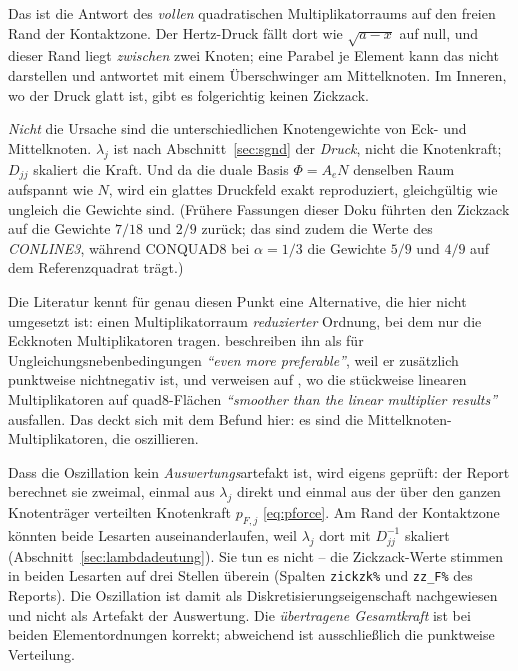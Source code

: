 \documentclass[a4paper,11pt]{article}
\def\bm#1{#1}%
\def\tfrac#1#2{#1/#2}%
\def\tilde#1{#1}%
\newcommand{\code}[1]{\texttt{\small #1}}
\begin{document}
\begin{itemize}
        Das ist die Antwort des \emph{vollen} quadratischen Multiplikatorraums auf den freien Rand
        der Kontaktzone. Der Hertz-Druck fällt dort wie $\sqrt{a-x}$ auf null, und dieser Rand
        liegt \emph{zwischen} zwei Knoten; eine Parabel je Element kann das nicht darstellen und
        antwortet mit einem Überschwinger am Mittelknoten. Im Inneren, wo der Druck glatt ist,
        gibt es folgerichtig keinen Zickzack.

        \emph{Nicht} die Ursache sind die unterschiedlichen Knotengewichte von Eck- und
        Mittelknoten. $\lambda_j$ ist nach Abschnitt~\ref{sec:sgnd} der \emph{Druck}, nicht die
        Knotenkraft; $\tilde D_{jj}$ skaliert die Kraft. Und da die duale Basis $\bm\Phi=\bm A_e\bm N$
        denselben Raum aufspannt wie $\bm N$, wird ein glattes Druckfeld exakt reproduziert,
        gleichgültig wie ungleich die Gewichte sind. (Frühere Fassungen dieser Doku führten den
        Zickzack auf die Gewichte $\tfrac{7}{18}$ und $\tfrac29$ zurück; das sind zudem die Werte
        des \emph{CONLINE3}, während CONQUAD8 bei $\alpha=\tfrac13$ die Gewichte $\tfrac59$ und
        $\tfrac49$ auf dem Referenzquadrat trägt.)

        Die Literatur kennt für genau diesen Punkt eine Alternative, die hier nicht umgesetzt ist:
        einen Multiplikatorraum \emph{reduzierter} Ordnung, bei dem nur die Eckknoten
        Multiplikatoren tragen. \citet[Abschn.~4]{popp2012} beschreiben ihn als für
        Ungleichungsnebenbedingungen \emph{``even more preferable''}, weil er zusätzlich punktweise
        nichtnegativ ist, und verweisen auf \citet{puso2008}, wo die stückweise linearen
        Multiplikatoren auf quad8-Flächen \emph{``smoother than the linear multiplier results''}
        ausfallen. Das deckt sich mit dem Befund hier: es sind die Mittelknoten-Multiplikatoren,
        die oszillieren.
\end{itemize}

\noindent Dass die Oszillation kein \emph{Auswertungs}artefakt ist, wird eigens geprüft: der
Report berechnet sie zweimal, einmal aus $\lambda_j$ direkt und einmal aus der über den ganzen
Knotenträger verteilten Knotenkraft $p_{F,j}$ \eqref{eq:pforce}. Am Rand der Kontaktzone könnten
beide Lesarten auseinanderlaufen, weil $\lambda_j$ dort mit $\tilde D_{jj}^{-1}$ skaliert
(Abschnitt~\ref{sec:lambdadeutung}). Sie tun es nicht -- die Zickzack-Werte stimmen in beiden
Lesarten auf drei Stellen überein (Spalten \code{zickzk\%} und \code{zz\_F\%} des Reports). Die
Oszillation ist damit als Diskretisierungseigenschaft nachgewiesen und nicht als Artefakt der
Auswertung. Die \emph{übertragene Gesamtkraft} ist bei beiden Elementordnungen korrekt; abweichend
ist ausschließlich die punktweise Verteilung.
\end{document}
